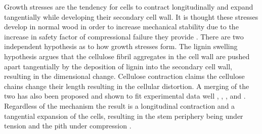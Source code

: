 Growth stresses are the tendency for cells to contract longitudinally and expand tangentially while developing their secondary cell wall. It is thought these stresses develop in normal wood in order to increase mechanical stability due to the increase in safety factor of compressional failure they provide \cite{mattheck1997wood}. There are two independent hypothesis as to how growth stresses form. The lignin swelling hypothesis \cite{boyd1950tree} argues that the cellulose fibril aggregates in the cell wall are pushed apart tangentially by the deposition of lignin into the secondary cell wall, resulting in the dimensional change. Cellulose contraction \cite{bamber1979}\cite{bamber2001general} claims the cellulose chains change their length resulting in the cellular distortion. A merging of the two has also been proposed and shown to fit experimental data well \cite{okuyama1986}, \cite{Okuyama_1994}, \cite{yamamoto1991}, \cite{ISI:A1992HP18200001} and \cite{Yamamoto_1998}. Regardless of the mechanism the result is a longitudinal contraction and a tangential expansion of the cells, resulting in the stem periphery being under tension and the pith under compression \cite{Archer_1987}. 